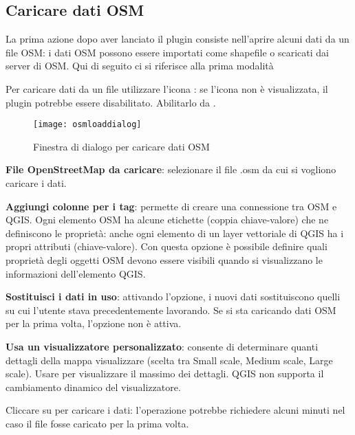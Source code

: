 \subsection{Caricare dati OSM}

La prima azione dopo aver lanciato il plugin consiste nell'aprire alcuni dati da un file OSM: i dati OSM possono 
essere importati come shapefile o scaricati dai server di OSM.
Qui di seguito ci si riferisce alla prima modalità

Per caricare dati da un file utilizzare l'icona : se l'icona non 
è visualizzata, il plugin potrebbe essere disabilitato. Abilitarlo da 
 \arrow {} \arrow {}.

\begin{figure}[ht]
   \centering
   \texttt{[image: osmloaddialog]}
   \caption{Finestra di dialogo per caricare dati OSM \nixcaption}\label{fig:osmload}
\end{figure}

\begin{description}
\item \textbf{File OpenStreetMap da caricare}: selezionare il file .osm da cui si vogliono caricare i dati.
\item \textbf{Aggiungi colonne per i tag}: permette di creare una connessione tra OSM e QGIS. Ogni elemento
OSM ha alcune etichette (coppia chiave-valore) che ne definiscono le proprietà: anche ogni elemento di un layer 
vettoriale di QGIS ha i propri attributi (chiave-valore). 
Con questa opzione è possibile definire quali proprietà degli oggetti OSM devono essere visibili quando si visualizzano 
le informazioni dell'elemento QGIS.
\item \textbf{Sostituisci i dati in uso}: attivando l'opzione, i nuovi dati sostituiscono quelli su cui l'utente 
stava precedentemente lavorando. Se si sta caricando dati OSM per la prima volta, l'opzione non è attiva.
\item \textbf{Usa un visualizzatore personalizzato}: consente di determinare quanti dettagli della mappa visualizzare 
(scelta tra Small scale, Medium scale, Large scale). Usare  per visualizzare il massimo dei
dettagli. QGIS \CURRENT non supporta il cambiamento dinamico del visualizzatore.
\end{description}

Cliccare su  per caricare i dati: l'operazione potrebbe richiedere alcuni minuti nel caso il file fosse 
caricato per la prima volta.

